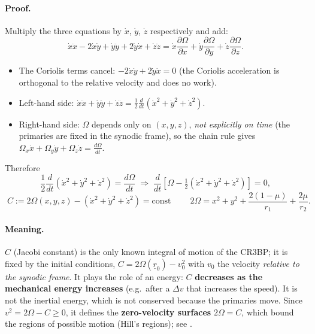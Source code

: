 \paragraph{Proof.} Multiply the three equations by $\dot x$, $\dot y$, $\dot z$ respectively and add:
\begin{equation}
\dot x\ddot x-2\dot x\dot y+\dot y\ddot y+2\dot y\dot x+\dot z\ddot z
=\dot x\frac{\partial\Omega}{\partial x}+\dot y\frac{\partial\Omega}{\partial y}+\dot z\frac{\partial\Omega}{\partial z}.
\end{equation}
\begin{itemize}
\item The Coriolis terms cancel: $-2\dot x\dot y+2\dot y\dot x=0$ (the Coriolis acceleration is orthogonal to the relative velocity
and does no work).
\item Left-hand side: $\dot x\ddot x+\dot y\ddot y+\dot z\ddot z=\frac12\frac{d}{dt}\left(\dot x^2+\dot y^2+\dot z^2\right)$.
\item Right-hand side: $\Omega$ depends only on $(x,y,z)$, \emph{not explicitly on time} (the primaries are fixed in the synodic frame),
so the chain rule gives $\Omega_x\dot x+\Omega_y\dot y+\Omega_z\dot z=\frac{d\Omega}{dt}$.
\end{itemize}
Therefore
\begin{equation}
\frac12\frac{d}{dt}\left(\dot{x}^{2}+\dot{y}^{2}+\dot{z}^{2}\right)=\frac{d\Omega}{dt}
\;\Longrightarrow\;
\frac{d}{dt}\left[\Omega-\tfrac12\left(\dot{x}^{2}+\dot{y}^{2}+\dot{z}^{2}\right)\right]=0,
\end{equation}
\begin{equation}
\boxed{\;C:=2\Omega(x,y,z)-\left(\dot{x}^{2}+\dot{y}^{2}+\dot{z}^{2}\right)=\text{const}\;}\qquad
2\Omega=x^2+y^2+\frac{2(1-\mu)}{r_1}+\frac{2\mu}{r_2}.
\end{equation}

\paragraph{Meaning.} $C$ (Jacobi constant) is the only known integral of motion of the CR3BP; it is fixed by the initial conditions,
$C=2\Omega(\underline r_0)-v_0^2$ with $v_0$ the velocity \emph{relative to the synodic frame}. It plays the role of an energy:
$C$ \textbf{decreases as the mechanical energy increases} (e.g.\ after a $\Delta v$ that increases the speed). It is not the
inertial energy, which is not conserved because the primaries move. Since $v^2=2\Omega-C\ge0$, it defines the
\textbf{zero-velocity surfaces} $2\Omega=C$, which bound the regions of possible motion (Hill's regions); see .


